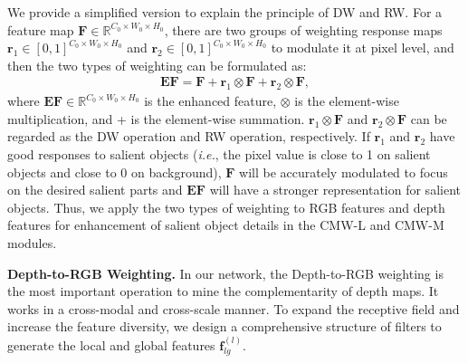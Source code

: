 \documentclass[runningheads]{llncs}
\newcommand{\ie}{\emph{i.e.}}
\begin{document}
We provide a simplified version to explain the principle of
DW and RW.
For a feature map $\mathbf{F}\!\in\!\mathbb{R}^{C_0\!\times\!W_0\!\times\! H_0}$,
there are two groups of  weighting response maps
$\mathbf{r}_1\!\in\![0,1]^{C_0\!\times\!W_0\!\times\! H_0}$ and
$\mathbf{r}_2\!\in\![0,1]^{C_0\!\times\!W_0\!\times\! H_0}$
to modulate it at pixel level, and then the two types of weighting can be formulated as:
\begin{equation}
   \begin{aligned}
    \mathbf{EF} = \mathbf{F} + \mathbf{r}_1\otimes\mathbf{F} + \mathbf{r}_2\otimes\mathbf{F},
    \label{eq:principle}
    \end{aligned}
\end{equation}
where $\mathbf{EF}\!\in\!\mathbb{R}^{C_0\!\times\!W_0\!\times\! H_0}$
is the enhanced feature, $\otimes$ is the element-wise multiplication,
and + is the element-wise summation.
$\mathbf{r}_1\otimes\mathbf{F}$ and
$\mathbf{r}_2\otimes\mathbf{F}$ can be regarded as the
DW operation and RW operation, respectively.
If $\mathbf{r}_1$ and $\mathbf{r}_2$ have good responses to
salient objects (\ie, the pixel value is close to 1 on salient objects
and close to 0 on background), $\mathbf{F}$ will be accurately
modulated to focus on the desired salient parts and $\mathbf{EF}$
will have a stronger representation for salient objects.
Thus, we apply the two types of weighting to RGB features
and depth features for enhancement of salient object details in the CMW-L and CMW-M
modules.




\noindent\textbf{Depth-to-RGB Weighting.}
In our network, the Depth-to-RGB weighting is the most important
operation to mine the complementarity of depth maps.
It works in a cross-modal and cross-scale manner.
To expand the receptive field and increase the feature diversity,
we design a comprehensive structure of filters to generate
the local and global features $\mathbf{f}^{(l)}_{lg}$.
\end{document}
